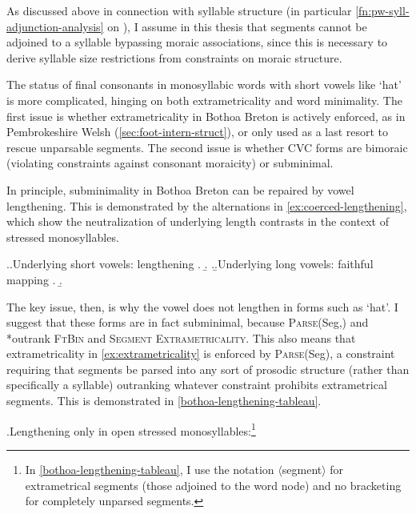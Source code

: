 As discussed above in connection with syllable structure (\cf in particular \cref{fn:pw-syll-adjunction-analysis} on ), I assume in this thesis that segments cannot be adjoined to a syllable bypassing moraic associations, since this is necessary to derive syllable size restrictions from constraints on moraic structure.

The status of final consonants in monosyllabic words with short vowels like \ipa{[ˈtɔɡ̊]} `hat' is more complicated, hinging on both extrametricality and word minimality. The first issue is whether extrametricality in Bothoa Breton is actively enforced, as in Pembrokeshire Welsh (\cref{sec:foot-intern-struct}), or only used as a last resort to rescue unparsable segments. The second issue is whether CVC forms are bimoraic (violating constraints against consonant moraicity) or subminimal.

In principle, subminimality in Bothoa Breton can be repaired by vowel lengthening. This is demonstrated by the alternations in \ref{ex:coerced-lengthening}, which show the neutralization of underlying length contrasts in the context of stressed monosyllables.

\ex.\label{ex:coerced-lengthening}\a.Underlying short vowels: lengthening
\a.
\b.
\z.\b.Underlying long vowels: faithful mapping
\a.
\b.

The key issue, then, is why the vowel does not lengthen in forms such as \ipa{[ˈtɔɡ̊]} `hat'. I suggest that these forms are in fact subminimal, because \textsc{Parse}(Seg,\sy) and *\mo[C] outrank \textsc{FtBin} and \textsc{Segment Extrametricality}. This also means that extrametricality in \ref{ex:extrametricality} is enforced by \textsc{Parse}(Seg), \ie a constraint requiring that segments be parsed into any sort of prosodic structure (rather than specifically a syllable) outranking whatever constraint prohibits extrametrical segments. This is demonstrated in \ref{bothoa-lengthening-tableau}.

\ex.\label{bothoa-lengthening-tableau}Lengthening only in open stressed monosyllables:\footnote{In \ref{bothoa-lengthening-tableau}, I use the notation $\langle$segment$\rangle$ for extrametrical segments (\ie those adjoined to the word node) and no bracketing for completely unparsed segments.}\\


